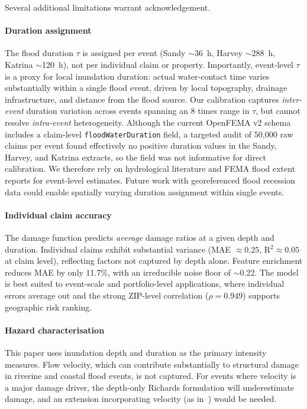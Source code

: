 Several additional limitations warrant acknowledgement.

\paragraph{Duration assignment} The flood duration $\tau$ is assigned per event (Sandy $\sim$36~h, Harvey $\sim$288~h, Katrina $\sim$120~h), not per individual claim or property. Importantly, event-level $\tau$ is a proxy for local inundation duration: actual water-contact time varies substantially within a single flood event, driven by local topography, drainage infrastructure, and distance from the flood source. Our calibration captures \textit{inter-event} duration variation across events spanning an 8 times range in $\tau$, but cannot resolve \textit{intra-event} heterogeneity. Although the current OpenFEMA v2 schema includes a claim-level \texttt{floodWaterDuration} field, a targeted audit of 50{,}000 raw claims per event found effectively no positive duration values in the Sandy, Harvey, and Katrina extracts, so the field was not informative for direct calibration. We therefore rely on hydrological literature and FEMA flood extent reports for event-level estimates. Future work with georeferenced flood recession data could enable spatially varying duration assignment within single events.

\paragraph{Individual claim accuracy} The damage function predicts \textit{average} damage ratios at a given depth and duration. Individual claims exhibit substantial variance (MAE $\approx 0.25$, R$^2 \approx 0.05$ at claim level), reflecting factors not captured by depth alone. Feature enrichment reduces MAE by only 11.7\%, with an irreducible noise floor of $\sim$0.22. The model is best suited to event-scale and portfolio-level applications, where individual errors average out and the strong ZIP-level correlation ($\rho = 0.949$) supports geographic risk ranking.

\paragraph{Hazard characterisation} This paper uses inundation depth and duration as the primary intensity measures. Flow velocity, which can contribute substantially to structural damage in riverine and coastal flood events, is not captured. For events where velocity is a major damage driver, the depth-only Richards formulation will underestimate damage, and an extension incorporating velocity (as in~\cite{merz2010review}) would be needed.

